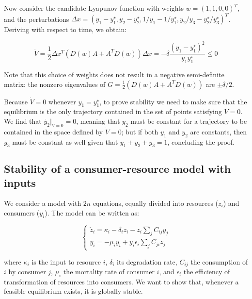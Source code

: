 \documentclass{article}
\begin{document}
Now consider the candidate Lyapunov function with weights
\(w = (1,1,0,0)^T\), and the perturbations
\(\Delta x = (y_1 - y_1^\star, y_2 - y_2^\star, 1/y_1 - 1 / y_1^\star, y_2 / y_3 - y_2^\star / y_3^\star)^T\).
Deriving with respect to time, we obtain:

\begin{equation}
\dot{V} = \frac{1}{2} \Delta x^T (D(w) A + A^T D(w)) \Delta x =  - \delta \frac{(y_1 - y_1^\star)^2}{y_1 y_1^\star} \leq 0
\end{equation}

Note that this choice of weights does not result in a negative
semi-definite matrix: the nonzero eigenvalues of
\(G= \frac{1}{2}(D(w) A + A^T D(w))\) are \(\pm \delta / 2\).

Because \(\dot{V} = 0\) whenever \(y_1 = y_1^\star\), to prove stability
we need to make sure that the equilibrium is the only trajectory
contained in the set of points satisfying \(\dot{V} = 0\). We find that
\(\dot{y_2}|_{\dot{V} = 0} = 0\), meaning that \(y_2\) must be constant
for a trajectory to be contained in the space defined by
\(\dot{V} = 0\); but if both \(y_1\) and \(y_2\) are constants, then
\(y_3\) must be constant as well given that \(y_1 + y_2 + y_3 = 1\),
concluding the proof.

\hypertarget{stability-of-a-consumer-resource-model-with-inputs}{%
\subsection{Stability of a consumer-resource model with
inputs}\label{stability-of-a-consumer-resource-model-with-inputs}}

We consider a model with \(2n\) equations, equally divided into
resources (\(z_i\)) and consumers (\(y_i\)). The model can be written
as:

\begin{equation}
\label{eq:cr}
\begin{cases}
\dot{z}_i = \kappa_i - \delta_i z_i - z_i \sum_j C_{ij} y_j\\
\dot{y}_i = - \mu_i y_i + y_i \epsilon_i \sum_j C_{ji} z_j
\end{cases}
\end{equation}

where \(\kappa_i\) is the input to resource \(i\), \(\delta_i\) its
degradation rate, \(C_{ij}\) the consumption of \(i\) by consumer \(j\),
\(\mu_i\) the mortality rate of consumer \(i\), and \(\epsilon_i\) the
efficiency of transformation of resources into consumers. We want to
show that, whenever a feasible equilibrium exists, it is globally
stable.
\end{document}
